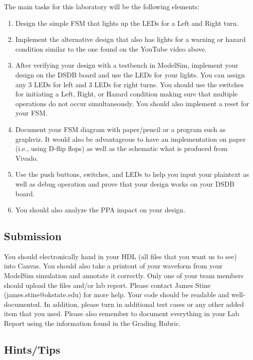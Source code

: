 \documentclass{article}
\begin{document}
The main tasks for this laboratory
will be the following elements:
\begin{enumerate}
  \item Design the simple FSM that lights up the LEDs for a Left and
    Right turn.
  \item Implement the alternative design that also has lights for a 
    warning or hazard condition similar to the one found on the YouTube
    video above.
  \item After verifying your design with a testbench in ModelSim,
    implement your design on the DSDB board and use the    
    LEDs for your lights.  You can assign any $3$ LEDs for left and
    $3$ LEDs for right turns.  You should use the switches for initiating a
    Left, Right, or Hazard condition making sure that multiple
    operations do not occur simultaneously.  You should also implement
    a reset for your FSM.
  \item Document your FSM diagram with paper/pencil or a program such
    as graphviz.  It would also be advantageous to have an
    implementation on paper (i.e., using D-flip flops)
    as well as the schematic what is produced from Vivado.
  \item Use the push buttons, switches, and LEDs to help you input
    your plaintext as well as debug operation and prove that your
    design works on your DSDB board.
    \item You should also analyze the PPA impact on your design. 
\end{enumerate}

\subsection{Submission}

You should electronically hand in your HDL (all files that you want
us to see) into Canvas.
You should also take a printout of your waveform 
from your ModelSim simulation and annotate it correctly.  
Only one of your team members should upload
the files and/or lab report. Please contact
James Stine
(james.stine@okstate.edu) 
for more help.  Your
code should be
readable and well-documented. In addition, please turn in additional
test cases or any other added item that you used. 
Please also remember to document everything in your Lab Report using
the information found in the Grading Rubric.


\subsection{Hints/Tips}
\end{document}
